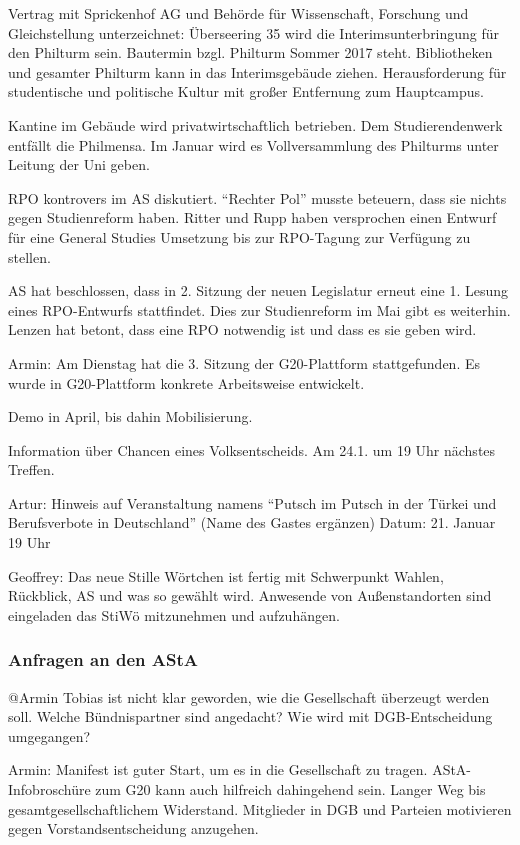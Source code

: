 \documentclass[ngerman,headheight=70pt]{scrartcl}
\begin{document}
    Vertrag mit Sprickenhof AG und Behörde für Wissenschaft, Forschung und
    Gleichstellung unterzeichnet:
    Überseering 35 wird die Interimsunterbringung für den Philturm sein. Bautermin
    bzgl. Philturm Sommer 2017 steht. Bibliotheken und gesamter Philturm kann
    in das Interimsgebäude ziehen. Herausforderung für studentische und politische
    Kultur mit großer Entfernung zum Hauptcampus.

    Kantine im Gebäude wird privatwirtschaftlich betrieben. Dem Studierendenwerk
    entfällt die Philmensa. Im Januar wird es Vollversammlung des Philturms
    unter Leitung der Uni geben.

    RPO kontrovers im AS diskutiert. ``Rechter Pol'' musste beteuern, dass sie
    nichts gegen Studienreform haben. Ritter und Rupp haben versprochen einen Entwurf
    für eine General Studies Umsetzung bis zur RPO-Tagung zur Verfügung zu stellen.

    AS hat beschlossen, dass in 2. Sitzung der neuen Legislatur erneut eine 1.
    Lesung eines RPO-Entwurfs stattfindet. Dies zur Studienreform im Mai gibt
    es weiterhin. Lenzen hat betont, dass eine RPO notwendig ist und dass es sie
    geben wird.

    Armin:
    Am Dienstag hat die 3. Sitzung der G20-Plattform stattgefunden. Es wurde
    in G20-Plattform konkrete Arbeitsweise entwickelt.

    Demo in April, bis dahin Mobilisierung.

    Information über Chancen eines Volksentscheids. Am 24.1. um 19 Uhr nächstes
    Treffen.

    Artur:
    Hinweis auf Veranstaltung namens ``Putsch im Putsch in der Türkei und
    Berufsverbote in Deutschland'' (Name des Gastes ergänzen)
    Datum: 21. Januar 19 Uhr

    Geoffrey:
    Das neue Stille Wörtchen ist fertig mit Schwerpunkt Wahlen, Rückblick, AS
    und was so gewählt wird. Anwesende von Außenstandorten sind eingeladen das
    StiWö mitzunehmen und aufzuhängen.

    \subsubsection{Anfragen an den AStA}

    @Armin
    Tobias ist nicht klar geworden, wie die Gesellschaft überzeugt werden soll.
    Welche Bündnispartner sind angedacht? Wie wird mit DGB-Entscheidung umgegangen?

    Armin:
    Manifest ist guter Start, um es in die Gesellschaft zu tragen.
    AStA-Infobroschüre zum G20 kann auch hilfreich dahingehend sein. Langer Weg
    bis gesamtgesellschaftlichem Widerstand. Mitglieder in DGB und Parteien
    motivieren gegen Vorstandsentscheidung anzugehen.
\end{document}
